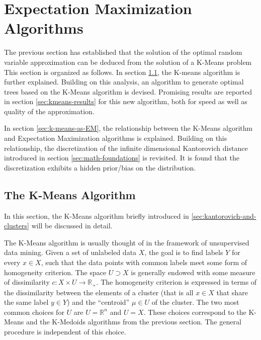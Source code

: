 \section{Expectation Maximization Algorithms}
\label{sec:expect-max-algos}
The previous section has established that the solution of the optimal random variable approximation can be deduced from the solution of a K-Means problem
This section is organized as follows.
In section \ref{sec:k-means-standard}, the K-means algorithm is further explained.
Building on this analysis, an algorithm to generate optimal trees based on the K-Means algorithm is devised.
Promising results are reported in section \ref{sec:kmeans-results} for this new algorithm, both for speed as well as quality of the approximation.

In section \ref{sec:k-means-as-EM}, the relationship between the K-Means algorithm and Expectation Maximization algorithms is explained.
Building on this relationship, the discretization of the infinite dimensional Kantorovich distance introduced in section \ref{sec:math-foundations} is revisited.
It is found that the discretization exhibits a hidden prior/bias on the distribution.
\subsection{The K-Means Algorithm}
\label{sec:k-means-standard}
In this section, the K-Means algorithm briefly introduced in \ref{sec:kantorovich-and-clusters} will be discussed in detail.

The K-Means algorithm is usually thought of in the framework of unsupervised data mining.
Given a set of unlabeled data $X$, the goal is to find labels $Y$ for every $x\in X$, such that the data points with common labels meet some form of homogeneity criterion.
The space $U\supset X$ is generally endowed with some measure of dissimilarity $c: X\times U\rightarrow \mathbb{R}_+$.
The homogeneity criterion is expressed in terms of the dissimilarity between the elements of a cluster (that is all $x\in X$ that share the same label $y\in Y$) and the ``centroid'' $\mu\in U$ of the cluster.
The two most common choices for $U$ are $U=\mathbb{R}^n$ and  $U=X$.
These choices correspond to the K-Means and the K-Medoids algorithms from the previous section.
The general procedure is independent of this choice.

